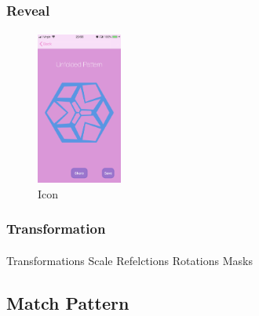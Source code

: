 \documentclass[11pt]{article}
\begin{document}
            

            \paragraph{} 
      


    \subsubsection{Reveal}
    
            \paragraph{}
            
            \begin{figure}
                        \centering
                        \includegraphics[width=0.25\textwidth]{KiriZen/createUnfoldedPattern.png}
                        \caption{Icon}
                        \label{fig:kiriZen-createUnfoldedPattern}
                    \end{figure}

        \subsubsection{Transformation}
        
                \paragraph{}
                
                Transformations
                Scale
                Refelctions
                Rotations
                Masks



    \subsection{Match Pattern}
\end{document}
